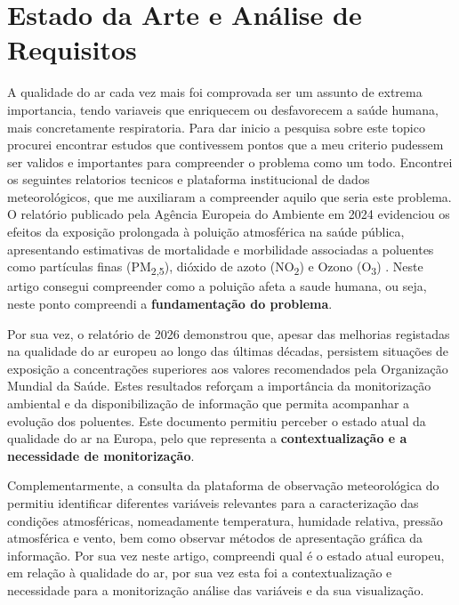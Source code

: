 \chapter{Estado da Arte e Análise de Requisitos}
\label{cap2}


A qualidade do ar cada vez mais foi comprovada ser um assunto de extrema importancia, tendo variaveis que enriquecem ou desfavorecem a saúde humana, mais concretamente respiratoria. Para dar inicio a pesquisa sobre este topico procurei encontrar estudos que contivessem pontos que a meu criterio pudessem ser validos e importantes para compreender o problema como um todo. Encontrei os seguintes relatorios tecnicos e plataforma institucional de dados meteorológicos, que me auxiliaram a compreender aquilo que seria este problema. 
O relatório publicado pela Agência Europeia do Ambiente em 2024 \cite{EEA2024} evidenciou os efeitos da exposição prolongada à poluição atmosférica na saúde pública, apresentando estimativas de mortalidade e morbilidade associadas a poluentes como partículas finas (PM\textsubscript{2,5}), dióxido de azoto (NO\textsubscript{2}) e Ozono (O\textsubscript{3}) . Neste artigo consegui compreender como a poluição afeta a saude humana, ou seja, neste ponto compreendi a \textbf{fundamentação do problema}.

Por sua vez, o relatório de 2026 \cite{EEA2026} demonstrou que, apesar das melhorias registadas na qualidade do ar europeu ao longo das últimas décadas, persistem situações de exposição a concentrações superiores aos valores recomendados pela Organização Mundial da Saúde. Estes resultados reforçam a importância da monitorização ambiental e da disponibilização de informação que permita acompanhar a evolução dos poluentes. Este documento permitiu perceber o estado atual da qualidade do ar na Europa, pelo que representa a \textbf{contextualização e a necessidade de monitorização}.

Complementarmente, a consulta da plataforma de observação meteorológica do \cite{IPMA} permitiu identificar diferentes variáveis relevantes para a caracterização das condições atmosféricas, nomeadamente temperatura, humidade relativa, pressão atmosférica e vento, bem como observar métodos de apresentação gráfica da informação. Por sua vez neste artigo, compreendi qual é o estado atual europeu, em relação à qualidade do ar, por sua vez esta foi a contextualização e necessidade para a monitorização análise das variáveis e da sua visualização.

